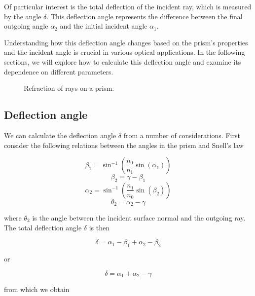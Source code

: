 \documentclass[
  a4paper,
]{book}
\begin{document}
Of particular interest is the total deflection of the incident ray,
which is measured by the angle \(\delta\). This deflection angle
represents the difference between the final outgoing angle \(\alpha_2\)
and the initial incident angle \(\alpha_1\).

Understanding how this deflection angle changes based on the prism's
properties and the incident angle is crucial in various optical
applications. In the following sections, we will explore how to
calculate this deflection angle and examine its dependence on different
parameters.

\begin{figure}


\caption{\label{fig-prism}Refraction of rays on a prism.}

\end{figure}%

\subsection{Deflection angle}\label{deflection-angle}

We can calculate the deflection angle \(\delta\) from a number of
considerations. First consider the following relations between the
angles in the prism and Snell's law

\[\beta_1=\sin^{-1}\left (\frac{n_0}{n_1}\sin(\alpha_1) \right)\]
\[\beta_2=\gamma-\beta_1\]
\[\alpha_2=\sin^{-1}\left (\frac{n_1}{n_0}\sin(\beta_2)\right )\]
\[\theta_2=\alpha_2-\gamma\]

where \(\theta_2\) is the angle between the incident surface normal and
the outgoing ray. The total deflection angle \(\delta\) is then

\[\delta =\alpha_1-\beta_1+\alpha_2-\beta_2\]

or

\[\delta =\alpha_1+\alpha_2-\gamma\]

from which we obtain
\end{document}
